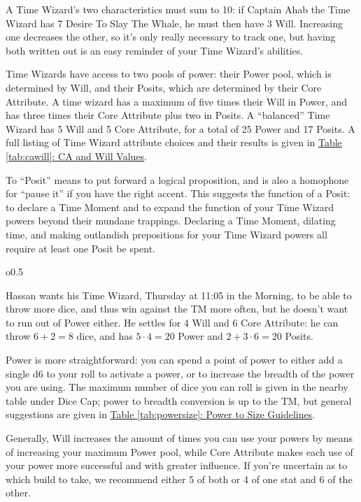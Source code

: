 \documentclass[twoside]{article}
\newenvironment{examplebox}[1]{\begin{tcolorbox}[colback=green!5!white,colframe=green!75!black,title={Example: #1}]}{\end{tcolorbox}\vspace{-30pt}}
\begin{document}
A Time Wizard's two characteristics must sum to 10: if Captain Ahab the Time Wizard has 7 Desire
To Slay The Whale, he must then have 3 Will. Increasing one decreases the other, so it's only
really necessary to track one, but having both written out is an easy reminder of your Time
Wizard's abilities.

Time Wizards have access to two pools of power: their Power pool, which is determined by Will,
and their Posits, which are determined by their Core Attribute. A time wizard has a maximum of
five times their Will in Power, and has three times their Core Attribute plus two in Posits.
A ``balanced'' Time Wizard has 5 Will and 5 Core Attribute, for a total of 25 Power and 17
Posits. A full listing of Time Wizard attribute choices and their results is given in
\hyperref[tab:cawill]{Table \ref*{tab:cawill}: CA and Will Values}.

To ``Posit'' means to put forward a logical proposition, and is also a homophone for ``pause
it'' if you have the right accent. This suggests the function of a Posit: to declare a Time
Moment and to expand the function of your Time Wizard powers beyond their mundane trappings.
Declaring a Time Moment, dilating time, and making outlandish prepositions for your Time Wizard
powers all require at least one Posit be spent.

\begin{wrapfigure}{o}{0.5\textwidth}
   \begin{examplebox}{Determining Characteristics}
      Hassan wants his Time Wizard, Thursday at 11:05 in the Morning, to be able to throw more
      dice, and thus win against the TM more often, but he doesn't want to run out of Power
      either. He settles for 4 Will and 6 Core Attribute: he can throw $6+2=8$ dice, and has
      $5\cdot 4=20$ Power and $2+3\cdot 6=20$ Posits.
   \end{examplebox}
   \vspace{20pt}
\end{wrapfigure}

Power is more straightforward: you can spend a point of power to either add a single d6 to your
roll to activate a power, or to increase the breadth of the power you are using. The maximum
number of dice you can roll is given in the nearby table under Dice Cap; power to breadth
conversion is up to the TM, but general suggestions are given in
\hyperref[tab:powersize]{Table \ref*{tab:powersize}: Power to Size Guidelines}.

Generally, Will increases the amount of times you can use your powers by means of increasing
your maximum Power pool, while Core Attribute makes each use of your power more successful and
with greater influence. If you're uncertain as to which build to take, we recommend either 5
of both or 4 of one stat and 6 of the other.
\end{document}

